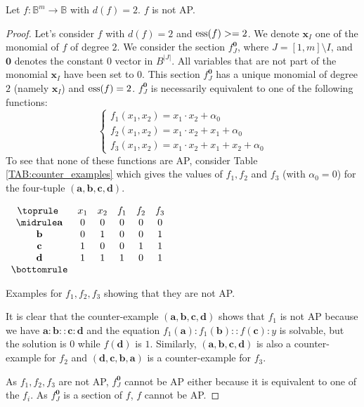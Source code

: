 \begin{property} \label{degree_2_not_AP}
 Let $f\colon \mathbb{B}^m\to \mathbb{B}$ with $d(f)=2$. $f$ is not AP.
\end{property}
\begin{proof}
  Let's consider $f$ with $d(f) = 2$ and $\operatorname{ess}(f) >= 2$. We denote
  $\mathbf{x}_I$ one of the monomial of $f$ of degree $2$. We consider the
  section $f^{\mathbf{0}}_J$, where $J = [1, m] \setminus I$,  and $\mathbf{0}$
  denotes the constant 0 vector in $B^{|J|}$. All variables that are not part
  of the monomial $\mathbf{x}_I$ have been set to $0$. This section
  $f^{\mathbf{0}}_J$ has a unique monomial of degree $2$ (namely
  $\mathbf{x}_I$) and $\operatorname{ess}(f) = 2$.  $f^{\mathbf{0}}_J$ is necessarily
  equivalent to one of the following functions:
  $$
  \begin{cases}
    f_1(x_1, x_2) = x_1 \cdot x_2 + \alpha_0 \\
    f_2(x_1, x_2) = x_1 \cdot x_2 + x_1 + \alpha_0\\
    f_3(x_1, x_2) = x_1 \cdot x_2 + x_1 + x_2 + \alpha_0
  \end{cases}$$
  To see that none of these functions are AP, consider Table
  \ref{TAB:counter_examples} which gives the values of $f_1, f_2$ and $f_3$
  (with $\alpha_0 = 0$) for the four-tuple $(\mathbf{a}, \mathbf{b},
  \mathbf{c}, \mathbf{d})$.
  \begin{table}[ht]
    \center
  $\begin{array}{cccccc}
    \toprule
    ~ & x_1 & x_2 & f_1 & f_2 & f_3\\
    \midrule
    \mathbf{a} & 0 & 0 & 0 & 0 & 0\\
    \mathbf{b} & 0 & 1 & 0 & 0 & 1\\
    \mathbf{c} & 1 & 0 & 0 & 1 & 1\\
    \mathbf{d} & 1 & 1 & 1 & 0 & 1\\
    \bottomrule
  \end{array}
  $\bigskip
  \caption{Examples for $f_1, f_2, f_3$ showing that they are not AP.}
  \label{TAB:counter_examples}
  \end{table}
  It is clear that the counter-example $(\mathbf{a},\mathbf{b}, \mathbf{c},
  \mathbf{d})$  shows that $f_1$  is not AP because we have $\mathbf{a} :
  \mathbf{b} :: \mathbf{c} : \mathbf{d}$ and the equation $f_1(\mathbf{a}) :
  f_1(\mathbf{b}) :: f(\mathbf{c}) : y$ is solvable, but the solution is $0$
  while $f(\mathbf{d})$ is $1$. Similarly, $(\mathbf{a},\mathbf{b}, \mathbf{c},
  \mathbf{d})$ is also a counter-example for $f_2$ and $(\mathbf{d},\mathbf{c},
  \mathbf{b}, \mathbf{a})$ is a counter-example for $f_3$.

  As $f_1, f_2, f_3$ are not AP, $f^{\mathbf{0}}_J$ cannot be AP either because
  it is equivalent to one of the $f_i$. As $f^{\mathbf{0}}_J$ is a section of
  $f$, $f$ cannot be AP.
\end{proof}

